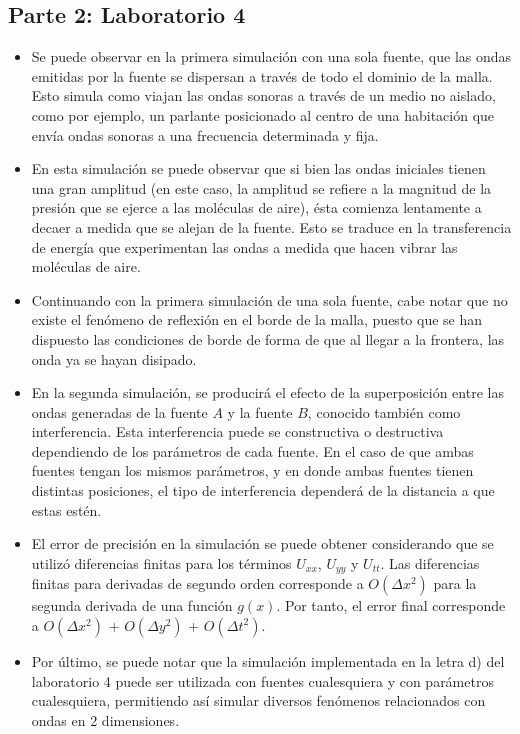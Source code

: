 \documentclass[letterpaper]{article}
\newcommand{\5}
{
\\[.5cm]
}
\begin{document}
\subsection{Parte 2: Laboratorio 4}
\begin{itemize}
\item Se puede observar en la primera simulación con una sola fuente, que las ondas emitidas por la fuente se dispersan a través de todo el dominio de la malla. Esto simula como viajan las ondas sonoras a través de un medio no aislado, como por ejemplo, un parlante posicionado al centro de una habitación que envía ondas sonoras a una frecuencia determinada y fija. \\
\item En esta simulación se puede observar que si bien las ondas iniciales tienen una gran amplitud (en este caso, la amplitud se refiere a la magnitud de la presión que se ejerce a las moléculas de aire), ésta comienza lentamente a decaer a medida que se alejan de la fuente. Esto se traduce en la transferencia de energía que experimentan las ondas a medida que hacen vibrar las moléculas de aire.
\item Continuando con la primera simulación de una sola fuente, cabe notar que no existe el fenómeno de reflexión en el borde de la malla, puesto que se han dispuesto las condiciones de borde de forma de que al llegar a la frontera, las onda ya se hayan disipado.
\item En la segunda simulación, se producirá el efecto de la superposición entre las ondas generadas de la fuente $A$ y la fuente $B$, conocido también como interferencia. Esta interferencia puede se constructiva o destructiva dependiendo de los parámetros de cada fuente. En el caso de que ambas fuentes tengan los mismos parámetros, y en donde ambas fuentes tienen distintas posiciones, el tipo de interferencia dependerá de la distancia a que estas estén.
\item El error de precisión en la simulación se puede obtener considerando que se utilizó diferencias finitas para los términos $U_{xx}$, $U_{yy}$ y $U_{tt}$. Las diferencias finitas para derivadas de segundo orden corresponde a $O(\Delta x^2)$ para la segunda derivada de una función $g(x)$. Por tanto, el error final corresponde a $O(\Delta x^2)$ + $O(\Delta y^2)$ + $O(\Delta t^2)$.

\item Por último, se puede notar que la simulación implementada en la letra d) del laboratorio 4 puede ser utilizada con fuentes cualesquiera y con parámetros cualesquiera, permitiendo así simular diversos fenómenos relacionados con ondas en 2 dimensiones.
\end{itemize}
\end{document}
